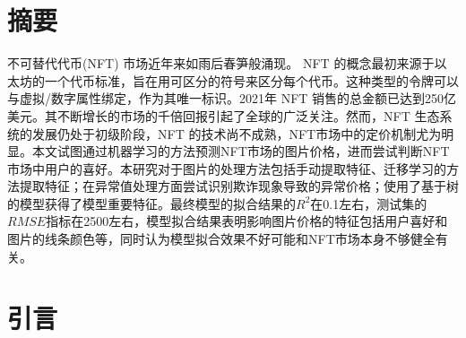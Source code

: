 \documentclass{article}
\begin{document}
\maketitle

{
	\section*{摘要}
	不可替代代币(NFT) 市场近年来如雨后春笋般涌现。 NFT 的概念最初来源于以太坊的一个代币标准，旨在用可区分的符号来区分每个代币。这种类型的令牌可以与虚拟/数字属性绑定，作为其唯一标识。2021年 NFT 销售的总金额已达到250亿美元。其不断增长的市场的千倍回报引起了全球的广泛关注。然而，NFT 生态系统的发展仍处于初级阶段，NFT 的技术尚不成熟，NFT市场中的定价机制尤为明显。本文试图通过机器学习的方法预测NFT市场的图片价格，进而尝试判断NFT市场中用户的喜好。本研究对于图片的处理方法包括手动提取特征、迁移学习的方法提取特征；在异常值处理方面尝试识别欺诈现象导致的异常价格；使用了基于树的模型获得了模型重要特征。最终模型的拟合结果的$R^2$在0.1左右，测试集的$RMSE$指标在2500左右，模型拟合结果表明影响图片价格的特征包括用户喜好和图片的线条颜色等，同时认为模型拟合效果不好可能和NFT市场本身不够健全有关。
}%
\newpage 
\tableofcontents
\newpage
\section{引言}
\end{document}
